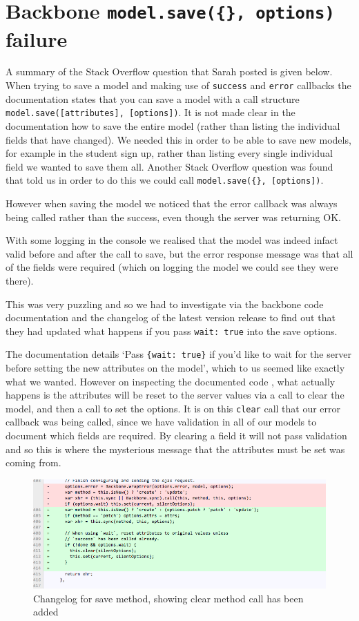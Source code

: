 \section{Backbone \texttt{model.save(\{\}, options)} failure}
A summary of the Stack Overflow question\cite{so_model_save} that Sarah posted is given below.
When trying to save a model and making use of \verb!success! and \verb!error! callbacks the documentation states that you can save a model with a call structure \verb!model.save([attributes], [options])!. 
It is not made clear in the documentation how to save the entire model (rather than listing the individual fields that have changed). We needed this in order to be able to save new models, for example in the student sign up, rather than listing every single individual field we wanted to save them all.
Another Stack Overflow question\cite{so_save_all_fields} was found that told us in order to do this we could call \verb!model.save({}, [options])!.

However when saving the model we noticed that the error callback was always being called rather than the success, even though the server was returning OK.

With some logging in the console we realised that the model was indeed infact valid before and after the call to save, but the error response message was that all of the fields were required (which on logging the model we could see they were there).

This was very puzzling and so we had to investigate via the backbone code documentation\cite{backbone_code} and the changelog of the latest version release\cite{backbone_change_log} to find out that they had updated what happens if you pass \verb!wait: true! into the save options.

The documentation details `Pass \verb!{wait: true}! if you'd like to wait for the server before setting the new attributes on the model', which to us seemed like exactly what we wanted. 
However on inspecting the documented code , what actually happens is the attributes will be reset to the server values via a call to clear the model, and then a call to set the options.
It is on this \verb!clear! call that our error callback was being called, since we have validation in all of our models
to document which fields are required. By clearing a field it will not pass validation and so this is where the mysterious message that the attributes must be set was coming from.

\begin{figure}[H]\centering
\includegraphics[scale=0.5]{images/appendix/backbone_changelog}
\caption{Changelog for save method, showing clear method call has been added}
\end{figure}

